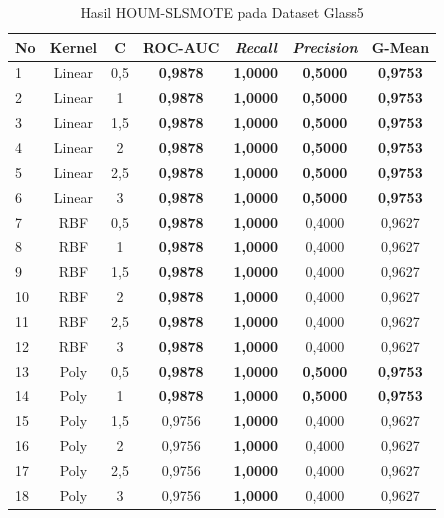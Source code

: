 \begin{table}[H]
\centering
\caption{Hasil HOUM-SLSMOTE pada Dataset Glass5}
\label{table:4.sls_glass}
\footnotesize
\begin{tabular}{|l|c|c|c|c|c|c|}
\hline
\textbf{No} & \textbf{Kernel} & \textbf{C} & \textbf{ROC-AUC} & \textbf{\textit{Recall}} & \textbf{\textit{Precision}} & \textbf{G-Mean} \\
\hline
1 & Linear & 0,5 & \textbf{0,9878} & \textbf{1,0000} & \textbf{0,5000} & \textbf{0,9753} \\
\hline
2 & Linear & 1 & \textbf{0,9878} & \textbf{1,0000} & \textbf{0,5000} & \textbf{0,9753} \\
\hline
3 & Linear & 1,5 & \textbf{0,9878} & \textbf{1,0000} & \textbf{0,5000} & \textbf{0,9753} \\
\hline
4 & Linear & 2 & \textbf{0,9878} & \textbf{1,0000} & \textbf{0,5000} & \textbf{0,9753} \\
\hline
5 & Linear & 2,5 & \textbf{0,9878} & \textbf{1,0000} & \textbf{0,5000} & \textbf{0,9753} \\
\hline
6 & Linear & 3 & \textbf{0,9878} & \textbf{1,0000} & \textbf{0,5000} & \textbf{0,9753} \\
\hline
7 & RBF & 0,5 & \textbf{0,9878} & \textbf{1,0000} & 0,4000 & 0,9627 \\
\hline
8 & RBF & 1 & \textbf{0,9878} & \textbf{1,0000} & 0,4000 & 0,9627 \\
\hline
9 & RBF & 1,5 & \textbf{0,9878} & \textbf{1,0000} & 0,4000 & 0,9627 \\
\hline
10 & RBF & 2 & \textbf{0,9878} & \textbf{1,0000} & 0,4000 & 0,9627 \\
\hline
11 & RBF & 2,5 & \textbf{0,9878} & \textbf{1,0000} & 0,4000 & 0,9627 \\
\hline
12 & RBF & 3 & \textbf{0,9878} & \textbf{1,0000} & 0,4000 & 0,9627 \\
\hline
13 & Poly & 0,5 & \textbf{0,9878} & \textbf{1,0000} & \textbf{0,5000} & \textbf{0,9753} \\
\hline
14 & Poly & 1 & \textbf{0,9878} & \textbf{1,0000} & \textbf{0,5000} & \textbf{0,9753} \\
\hline
15 & Poly & 1,5 & 0,9756 & \textbf{1,0000} & 0,4000 & 0,9627 \\
\hline
16 & Poly & 2 & 0,9756 & \textbf{1,0000} & 0,4000 & 0,9627 \\
\hline
17 & Poly & 2,5 & 0,9756 & \textbf{1,0000} & 0,4000 & 0,9627 \\
\hline
18 & Poly & 3 & 0,9756 & \textbf{1,0000} & 0,4000 & 0,9627 \\
\hline
\end{tabular}
\end{table}

